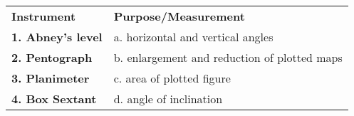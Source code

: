 \begin{tabular}{>{\bfseries}l l}
Instrument & \textbf{Purpose/Measurement} \\
1. Abney's level & a. horizontal and vertical angles \\
2. Pentograph & b. enlargement and reduction of plotted maps \\
3. Planimeter & c. area of plotted figure \\
4. Box Sextant & d. angle of inclination \\
\end{tabular}
